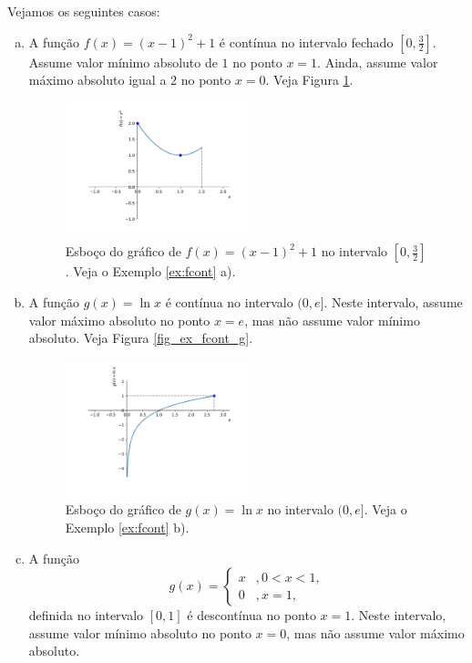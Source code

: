 \begin{ex}\label{ex:fcont}
  Vejamos os seguintes casos:
  \begin{enumerate}[a)]
  \item  A função $f(x) = (x-1)^2+1$ é contínua no intervalo fechado $[0,\frac{3}{2}]$. Assume valor mínimo absoluto de $1$ no ponto $x=1$. Ainda, assume valor máximo absoluto igual a $2$ no ponto $x=0$. Veja Figura \ref{fig:ex_fcont_f}.
  \begin{figure}[H]
    \centering
    \includegraphics[width=0.5\textwidth]{./cap_apderiv/dados/fig_ex_fcont/fig_f}
    \caption{Esboço do gráfico de $f(x) = (x-1)^2+1$ no intervalo $[0,\frac{3}{2}]$. Veja o Exemplo \ref{ex:fcont} a).}
    \label{fig:ex_fcont_f}
  \end{figure}
\item A função $g(x) = \ln x$ é contínua no intervalo $(0, e]$. Neste intervalo, assume valor máximo absoluto no ponto $x=e$, mas não assume valor mínimo absoluto. Veja Figura \ref{fig_ex_fcont_g}.
  \begin{figure}[H]
    \centering
    \includegraphics[width=0.5\textwidth]{./cap_apderiv/dados/fig_ex_fcont/fig_g}
    \caption{Esboço do gráfico de $g(x) = \ln x$ no intervalo $(0,e]$. Veja o Exemplo \ref{ex:fcont} b).}
    \label{fig:ex_fcont_g}
  \end{figure}
  
\item A função
  \begin{equation}
    g(x) = \left\{
      \begin{array}{ll}
        x &, 0<x<1,\\
        0 &, x=1,
      \end{array}
\right.
\end{equation}
definida no intervalo $[0,1]$ é descontínua no ponto $x=1$. Neste intervalo, assume valor mínimo absoluto no ponto $x=0$, mas não assume valor máximo absoluto.
  \end{enumerate}
\end{ex}

\emconstrucao